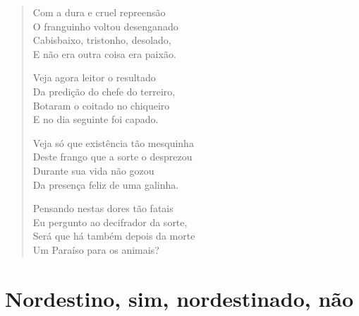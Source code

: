\begin{verse}
Com a dura e cruel repreensão\\
O franguinho voltou desenganado\\
Cabisbaixo, tristonho, desolado,\\
E não era outra coisa era paixão.

Veja agora leitor o resultado\\
Da predição do chefe do terreiro,\\
Botaram o coitado no chiqueiro\\
E no dia seguinte foi capado.

Veja só que existência tão mesquinha\\
Deste frango que a sorte o desprezou\\
Durante sua vida não gozou\\
Da presença feliz de uma galinha.

Pensando nestas dores tão fatais\\
Eu pergunto ao decifrador da sorte,\\
Será que há também depois da morte\\
Um Paraíso para os animais?
\end{verse}

\chapter{Nordestino, sim, nordestinado, não}

